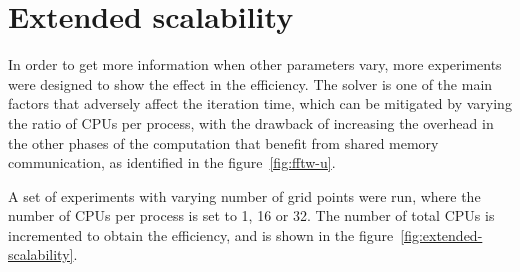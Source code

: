 
\section{Extended scalability}

In order to get more information when other parameters vary, more experiments 
were designed to show the effect in the efficiency. The solver is one of the 
main factors that adversely affect the iteration time, which can be mitigated by 
varying the ratio of CPUs per process, with the drawback of increasing the 
overhead in the other phases of the computation that benefit from shared memory 
communication, as identified in the figure~\ref{fig:fftw-u}.

A set of experiments with varying number of grid points were run, where the 
number of CPUs per process is set to 1, 16 or 32. The number of total CPUs is 
incremented to obtain the efficiency, and is shown in the 
figure~\ref{fig:extended-scalability}.





